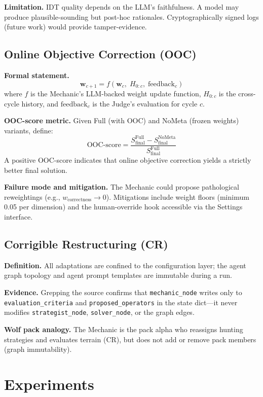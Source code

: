 \documentclass[letterpaper]{article}
\begin{document}
\textbf{Limitation.} IDT quality depends on the LLM's faithfulness.
A model may produce plausible-sounding but post-hoc rationales.
Cryptographically signed logs (future work) would provide tamper-evidence.

\subsection{Online Objective Correction (OOC)}

\textbf{Formal statement.}
\[
  \mathbf{w}_{c+1} = f(\mathbf{w}_c,\; H_{0:c},\; \text{feedback}_c)
\]
where $f$ is the Mechanic's LLM-backed weight update function,
$H_{0:c}$ is the cross-cycle history, and $\text{feedback}_c$ is the
Judge's evaluation for cycle $c$.

\textbf{OOC-score metric.}  Given Full (with OOC) and NoMeta (frozen
weights) variants, define:
\[
  \text{OOC-score} = \frac{S^{\text{Full}}_{\text{final}}
                          - S^{\text{NoMeta}}_{\text{final}}}
                         {S^{\text{Full}}_{\text{final}}}
\]
A positive OOC-score indicates that online objective correction yields a
strictly better final solution.

\textbf{Failure mode and mitigation.}  The Mechanic could propose
pathological reweightings (e.g., $w_{\text{correctness}} \to 0$).
Mitigations include weight floors (minimum 0.05 per dimension) and the
human-override hook accessible via the Settings interface.

\subsection{Corrigible Restructuring (CR)}

\textbf{Definition.}  All adaptations are confined to the configuration
layer; the agent graph topology and agent prompt templates are immutable
during a run.

\textbf{Evidence.}  Grepping the source confirms that \texttt{mechanic\_node}
writes only to \texttt{evaluation\_criteria} and \texttt{proposed\_operators}
in the state dict---it never modifies \texttt{strategist\_node},
\texttt{solver\_node}, or the graph edges.

\textbf{Wolf pack analogy.}  The Mechanic is the pack alpha who reassigns
hunting strategies and evaluates terrain (CR), but does not add or remove
pack members (graph immutability).

\section{Experiments}
\end{document}
